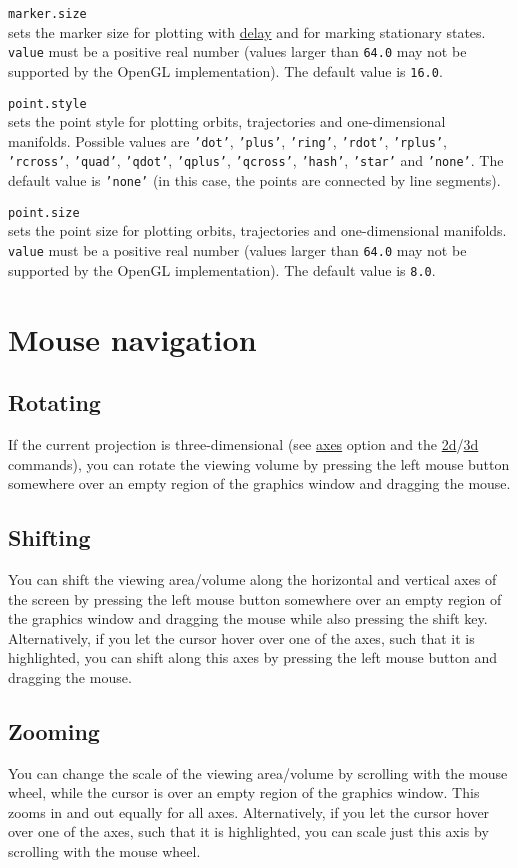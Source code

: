 \documentclass[10pt,a4paper,titlepage]{article}
\newcommand{\opt}[2]{\item{\T{\hypertarget{#1}{#1}\index[index]{#1} #2}}}
\newcommand{\HL}[1]{\hyperlink{#1}{#1}}
\newcommand{\T}[1]{\texttt{#1}}
\begin{document}
\begin{description}
\opt{marker.size}{}\\
sets the marker size for plotting with \HL{delay} and for marking stationary states. \T{value} must be a positive real number (values larger than \T{64.0} may not be supported by the OpenGL implementation). The default value is \T{16.0}.
\opt{point.style}{}\\
sets the point style for plotting orbits, trajectories and one-dimensional manifolds. Possible values are \T{'dot'}, \T{'plus'}, \T{'ring'}, \T{'rdot'}, \T{'rplus'}, \T{'rcross'}, \T{'quad'}, \T{'qdot'}, \T{'qplus'}, \T{'qcross'}, \T{'hash'}, \T{'star'} and \T{'none'}. The default value is \T{'none'} (in this case, the points are connected by line segments).
\opt{point.size}{}\\ 
sets the point size for plotting orbits, trajectories and one-dimensional manifolds.  \T{value} must be a positive real number (values larger than \T{64.0} may not be supported by the OpenGL implementation). The default value is \T{8.0}.
\end{description}
 \newpage\section{Mouse navigation}
\label{sec::mouse}
\subsection{Rotating}
If the current projection is three-dimensional (see \HL{axes} option and the \HL{2d}/\HL{3d} commands), you can rotate the viewing volume by pressing the left mouse button somewhere over an empty region of the graphics window and dragging the mouse.
\subsection{Shifting}
You can shift the viewing area/volume along the horizontal and vertical axes of the screen by pressing the left mouse button somewhere over an empty region of the graphics window and dragging the mouse while also pressing the shift key. Alternatively, if you let the cursor hover over one of the axes, such that it is highlighted, you can shift along this axes by pressing the left mouse button and dragging the mouse.
\subsection{Zooming}
You can change the scale of the viewing area/volume by scrolling with the mouse wheel, while the cursor is over an empty region of the graphics window. This zooms in and out equally for all axes. Alternatively, if you let the cursor hover over one of the axes, such that it is highlighted, you can scale just this axis by scrolling with the mouse wheel.
\end{document}
